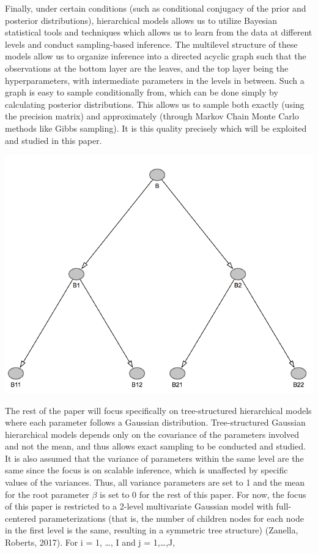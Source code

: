 \documentclass[]{article}
\begin{document}
Finally, under certain conditions (such as conditional conjugacy of the
prior and posterior distributions), hierarchical models allows us to
utilize Bayesian statistical tools and techniques which allows us to
learn from the data at different levels and conduct sampling-based
inference. The multilevel structure of these models allow us to organize
inference into a directed acyclic graph such that the observations at
the bottom layer are the leaves, and the top layer being the
hyperparameters, with intermediate parameters in the levels in between.
Such a graph is easy to sample conditionally from, which can be done
simply by calculating posterior distributions. This allows us to sample
both exactly (using the precision matrix) and approximately (through
Markov Chain Monte Carlo methods like Gibbs sampling). It is this
quality precisely which will be exploited and studied in this paper.

\begin{center}\includegraphics[width=200bp]{Paper_files/figure-latex/example-1} \end{center}

\begin{center}   \end{center}

\vspace{0.5cm}

\newline 

The rest of the paper will focus specifically on tree-structured
hierarchical models where each parameter follows a Gaussian
distribution. Tree-structured Gaussian hierarchical models depends only
on the covariance of the parameters involved and not the mean, and thus
allows exact sampling to be conducted and studied. It is also assumed
that the variance of parameters within the same level are the same since
the focus is on scalable inference, which is unaffected by specific
values of the variances. Thus, all variance parameters are set to 1 and
the mean for the root parameter \(\beta\) is set to 0 for the rest of
this paper. For now, the focus of this paper is restricted to a 2-level
multivariate Gaussian model with full-centered parameterizations (that
is, the number of children nodes for each node in the first level is the
same, resulting in a symmetric tree structure) (Zanella, Roberts, 2017).
For i = 1, \ldots{}, I and j = 1,\ldots{},J,
\end{document}
